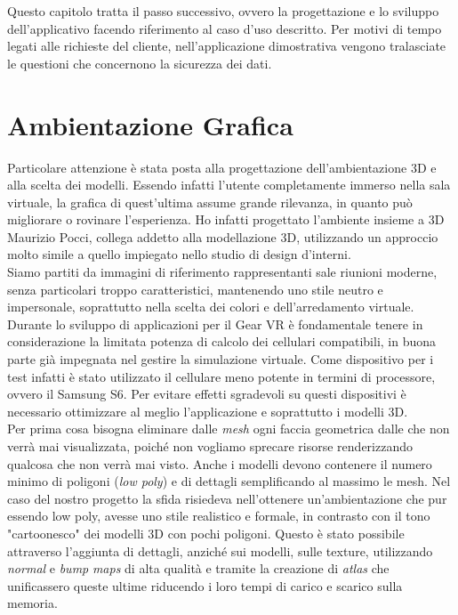 Questo capitolo tratta il passo successivo, ovvero la progettazione e lo sviluppo dell'applicativo facendo riferimento al caso d'uso descritto. Per motivi di tempo legati alle richieste del cliente, nell'applicazione dimostrativa vengono tralasciate le questioni che concernono la sicurezza dei dati.

\section{Ambientazione Grafica}
Particolare attenzione è stata posta alla progettazione dell'ambientazione 3D e alla scelta dei modelli. Essendo infatti l'utente completamente immerso nella sala virtuale, la grafica di quest'ultima assume grande rilevanza, in quanto può migliorare o rovinare l'esperienza. Ho infatti progettato l'ambiente insieme a 3D Maurizio Pocci, collega addetto alla modellazione 3D, utilizzando un approccio molto simile a quello impiegato nello studio di design d'interni.\\
Siamo partiti da immagini di riferimento rappresentanti sale riunioni moderne, senza particolari troppo caratteristici, mantenendo uno stile neutro e impersonale, soprattutto nella scelta dei colori e dell'arredamento virtuale.\\
Durante lo sviluppo di applicazioni per il Gear VR è fondamentale tenere in considerazione la limitata potenza di calcolo dei cellulari compatibili, in buona parte già impegnata nel gestire la simulazione virtuale. Come dispositivo per i test infatti è stato utilizzato il cellulare meno potente in termini di processore, ovvero il Samsung S6. Per evitare effetti sgradevoli su questi dispositivi è necessario ottimizzare al meglio l'applicazione e soprattutto i modelli 3D.\\
Per prima cosa bisogna eliminare dalle \textit{mesh} ogni faccia geometrica dalle che non verrà mai visualizzata, poiché non vogliamo sprecare risorse renderizzando qualcosa che non verrà mai visto. Anche i modelli devono contenere il numero minimo di poligoni (\textit{low poly}) e di dettagli semplificando al massimo le mesh. Nel caso del nostro progetto la sfida risiedeva nell'ottenere un'ambientazione che pur essendo low poly, avesse uno stile realistico e formale, in contrasto con il tono "cartoonesco" dei modelli 3D con pochi poligoni. Questo è stato possibile attraverso l'aggiunta di dettagli, anziché sui modelli, sulle texture, utilizzando \textit{normal} e \textit{bump} \textit{maps} di alta qualità e tramite la creazione di \textit{atlas} che unificassero queste ultime riducendo i loro tempi di carico e scarico sulla memoria. 
